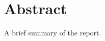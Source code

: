 \chapter*{\vspace{-80pt}\centering \large Abstract \vspace{-35pt}}%

A brief summary of the report.
